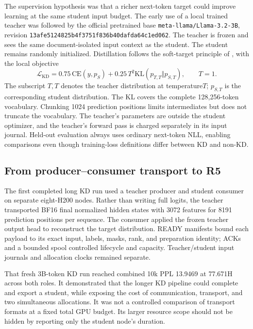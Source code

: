 The supervision hypothesis was that a richer next-token target could improve learning at the same student input budget. The early use of a local trained teacher was followed by the official pretrained base \texttt{meta-llama/Llama-3.2-3B}, revision \texttt{13afe5124825b4f3751f836b40dafda64c1ed062}. The teacher is frozen and sees the same document-isolated input context as the student. The student remains randomly initialized. Distillation follows the soft-target principle of \citet{distillation}, with the local objective
\begin{equation}
  \mathcal{L}_{\mathrm{KD}}=0.75\,\mathrm{CE}(y,p_S)
                  +0.25\,T^2\mathrm{KL}(p_{T,T}\Vert p_{S,T}),\qquad T=1.
  \label{eq:kd}
\end{equation}
The subscript $T,T$ denotes the teacher distribution at temperature$T$; $p_{S,T}$ is the corresponding student distribution. The KL covers the complete 128,256-token vocabulary. Chunking 1024 prediction positions limits intermediates but does not truncate the vocabulary. The teacher's parameters are outside the student optimizer, and the teacher's forward pass is charged separately in its input journal. Held-out evaluation always uses ordinary next-token NLL, enabling comparisons even though training-loss definitions differ between KD and non-KD.

\subsection{From producer--consumer transport to R5}

The first completed long KD run used a teacher producer and student consumer on separate eight-H200 nodes. Rather than writing full logits, the teacher transported BF16 final normalized hidden states with 3072 features for 8191 prediction positions per sequence. The consumer applied the frozen teacher output head to reconstruct the target distribution. READY manifests bound each payload to its exact input, labels, masks, rank, and preparation identity; ACKs and a bounded spool controlled lifecycle and capacity. Teacher/student input journals and allocation clocks remained separate.

That fresh 3B-token KD run reached combined 10k PPL 13.9469 at 77.671H across both roles. It demonstrated that the longer KD pipeline could complete and export a student, while exposing the cost of communication, transport, and two simultaneous allocations. It was not a controlled comparison of transport formats at a fixed total GPU budget. Its larger resource scope should not be hidden by reporting only the student node's duration.

